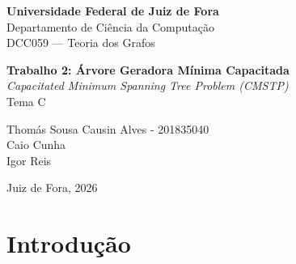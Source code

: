 \documentclass[12pt, a4paper]{article}
\begin{document}
\begin{titlepage}
    \centering
    \vspace*{1cm}

    {\large \textbf{Universidade Federal de Juiz de Fora}}\\
    {\large Departamento de Ciência da Computação}\\
    {\large DCC059 --- Teoria dos Grafos}\\

    \vspace{3cm}

    {\LARGE \textbf{Trabalho 2: Árvore Geradora Mínima Capacitada}}\\[0.5cm]
    {\Large \textit{Capacitated Minimum Spanning Tree Problem (CMSTP)}}\\[0.3cm]
    {\large Tema C}

    \vspace{3cm}

    {\large
        Thomás Sousa Causin Alves - 201835040\\
        Caio Cunha\\
        Igor Reis
    }

    \vfill

    {\large Juiz de Fora, 2026}
\end{titlepage}

\tableofcontents
\newpage

\section{Introdução}
\end{document}
